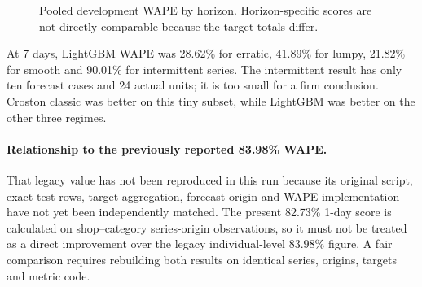\documentclass[11pt,a4paper]{article}
\begin{document}
\begin{figure}[H]\centering
{}
\caption{Pooled development WAPE by horizon. Horizon-specific scores are not directly comparable because the target totals differ.}
\end{figure}


At 7 days, LightGBM WAPE was 28.62\% for erratic, 41.89\% for lumpy, 21.82\% for smooth and 90.01\% for intermittent series. The intermittent result has only ten forecast cases and 24 actual units; it is too small for a firm conclusion. Croston classic was better on this tiny subset, while LightGBM was better on the other three regimes.

\paragraph{Relationship to the previously reported 83.98\% WAPE.}
That legacy value has not been reproduced in this run because its original
script, exact test rows, target aggregation, forecast origin and WAPE
implementation have not yet been independently matched. The present 82.73\%
1-day score is calculated on shop--category series-origin observations, so it
must not be treated as a direct improvement over the legacy individual-level
83.98\% figure. A fair comparison requires rebuilding both results on identical
series, origins, targets and metric code.
\end{document}
